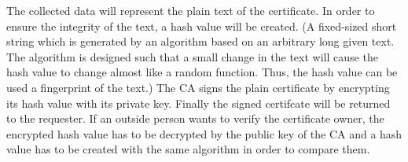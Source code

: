 The collected data will represent the plain text of the certificate. In order to ensure the integrity of the text, 
a hash value will be created. (A fixed-sized short string which is generated by an algorithm based on an arbitrary long given text. The algorithm is designed such that a small change in the text will cause the hash value to change almost like a random function. Thus, the hash value can be used a fingerprint of the text.) The CA signs the plain certificate by encrypting its hash value with its private key. Finally the signed certifcate will be returned to the requester.
%
%
If an outside person wants to verify the certificate owner, the encrypted hash value has to be decrypted by the public key of the CA and a hash value has to be created with the same algorithm in order to compare them.\\


